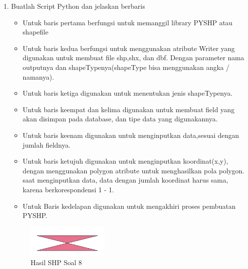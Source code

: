 \begin{enumerate}
	\item Buatlah Script Python dan jelaskan berbaris
	
	\begin{itemize}
		\item Untuk baris pertama berfungsi untuk memanggil library PYSHP atau shapefile
		\item Untuk baris kedua berfungsi untuk menggunakan atribute Writer yang digunakan untuk membuat file shp,shx, dan dbf. \hfill\break Dengan parameter nama outputnya dan shapeTypenya(shapeType bisa menggunakan angka / namanya).
		\item Untuk baris ketiga digunakan untuk menentukan jenis shapeTypenya.
		\item Untuk baris keempat dan kelima digunakan untuk membuat field yang akan disimpan pada database, dan tipe data yang digunakannya.
		\item Untuk baris keenam digunakan untuk menginputkan data,sesuai dengan jumlah fieldnya.
		\item Untuk baris ketujuh digunakan untuk menginputkan koordinat(x,y), dengan menggunakan polygon atribute untuk menghasilkan pola polygon. \hfill\break
		saat menginputkan data, data dengan jumlah koordinat harus sama, karena berkorespondensi 1 - 1.
		\item Untuk Baris kedelapan digunakan untuk mengakhiri proses pembuatan PYSHP.
	\end{itemize}
	\hfill\break
	\begin{figure}[H]
		\includegraphics[width=4cm]{figures/1174004/2/8.png}
		\centering
		\caption{Hasil SHP Soal 8}
	\end{figure}


\end{enumerate}
